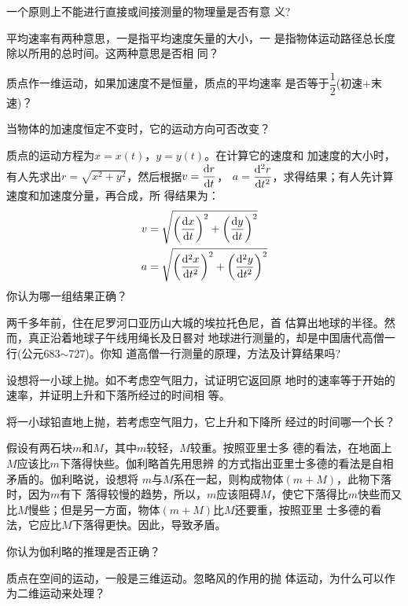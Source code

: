 \questions
\fangsong
\question 一个原则上不能进行直接或间接测量的物理量是否有意
义?

\question 平均速率有两种意思，一是指平均速度矢量的大小，一
是指物体运动路径总长度除以所用的总时间。这两种意思是否相
同？

\question 质点作一维运动，如果加速度不是恒量，质点的平均速率
是否等于$\dfrac 1 2$(初速+末速)？

\question 当物体的加速度恒定不变时，它的运动方向可否改变？

\question 质点的运动方程为$x=x(t)$，$y=y(t)$。在计算它的速度和
加速度的大小时，有人先求出$r=\sqrt{x^2+y^2}$，然后根据$v=\dfrac{{\rm d} r}{{\rm d} t}$，
$a=\dfrac{{\rm d} ^2r}{{\rm d} t^2}$，求得结果；有人先计算速度和加速度分量，再合成，所
得结果为：\vspace{-1em}
\begin{equation*}
    \begin{aligned}
        v &=\sqrt{\left(\frac{{\rm d}  x}{{\rm d}  t}\right)^{2}+\left(\frac{{\rm d}  y}{{\rm d}  t}\right)^{2}} \\
        a &=\sqrt{\left(\frac{{\rm d} ^{2} x}{{\rm d}  t^{2}}\right)^{2}+\left(\frac{{\rm d} ^{2} y}{{\rm d}  t^{2}}\right)^{2}}
    \end{aligned}
\end{equation*}
你认为哪一组结果正确？

\question  两千多年前，住在尼罗河口亚历山大城的埃拉托色尼，首
估算出地球的半径。然而，真正沿着地球子午线用绳长及日晷对
地球进行测量的，却是中国唐代高僧一行(公元683$\sim$727)。你知
道高僧一行测量的原理，方法及计算结果吗?

\question  设想将一小球上抛。如不考虑空气阻力，试证明它返回原
地时的速率等于开始的速率，并证明上升和下落所经过的时间相
等。

\question  将一小球铅直地上抛，若考虑空气阻力，它上升和下降所
经过的时间哪一个长？

\question  假设有两石块$m$和$M$，其中$m$较轻，$M$较重。按照亚里士多
德的看法，在地面上$M$应该比$m$下落得快些。伽利略首先用思辨
的方式指出亚里士多德的看法是自相矛盾的。伽利略说，设想将
$m$与$M$系在一起，则构成物体$(m+M)$，此物下落时，因为$m$有下
落得较慢的趋势，所以，$m$应该阻碍$M$，使它下落得比$m$快些而又
比$M$慢些；但是另一方面，物体$(m+M)$比$M$还要重，按照亚里
士多德的看法，它应比$M$下落得更快。因此，导致矛盾。

你认为伽利略的推理是否正确？

\question  质点在空间的运动，一般是三维运动。忽略风的作用的抛
体运动，为什么可以作为二维运动来处理？
\normalfont
